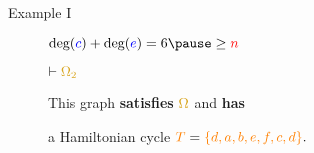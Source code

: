 \documentclass[pdf]{beamer}
\newcommand{\n}{\textcolor{red}{n}}
\newcommand{\T}{\textcolor{orange}{T}}
\newcommand{\bluec}{\textcolor{blue}{c}}
\newcommand{\bluee}{\textcolor{blue}{e}}
\newcommand{\ore}{\textcolor{gold}{\Omega}}
\newcommand{\oresecondcond}{\textcolor{gold}{\Omega_2}}
\newcommand{\gdeg}{\text{deg}}
\begin{document}
\begin{frame}{Example I}
\begin{figure}
{            \pause

            $\gdeg(\bluec) + \gdeg(\bluee) = 6 \pause \geq \n$}

            \pause

            $\vdash \oresecondcond$

            \pause

            \vspace{5px}

            This graph \textbf{satisfies} $\ore$ and \textbf{has}
            
            a Hamiltonian cycle $\T = \textcolor{orange}{\{d,a,b,e,f,c,d\}}.$
        \end{figure}
    \end{frame}

\end{document}
